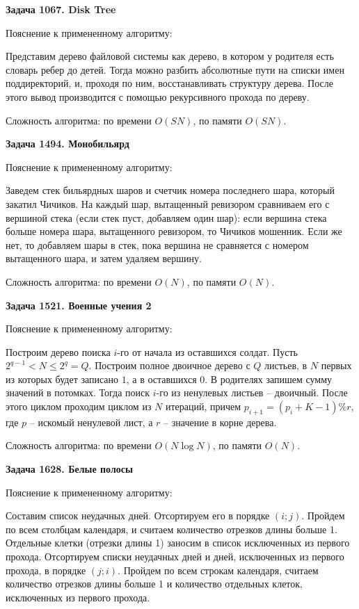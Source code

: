 \documentclass[12pt,a4paper]{article}
\begin{document}
    \newcommand{\LabNumber}{3}
    

    \textbf{Задача 1067. Disk Tree}

    Пояснение к примененному алгоритму:

    Представим дерево файловой системы как дерево, в котором у родителя есть словарь ребер до детей.
    Тогда можно разбить абсолютные пути на списки имен поддиректорий, и, проходя по ним, восстанавливать
    структуру дерева.
    После этого вывод производится с помощью рекурсивного прохода по дереву.

    Сложность алгоритма: по времени $O(SN)$, по памяти $O(SN)$.

    \bigskip

    \textbf{Задача 1494. Монобильярд}

    Пояснение к примененному алгоритму:

    Заведем стек бильярдных шаров и счетчик номера последнего шара, который закатил Чичиков.
    На каждый шар, вытащенный ревизором сравниваем его с вершиной стека (если стек пуст, добавляем один шар):
    если вершина стека больше номера шара, вытащенного ревизором, то Чичиков мошенник.
    Если же нет, то добавляем шары в стек, пока вершина не сравняется с номером вытащенного шара,
    и затем удаляем вершину.

    Сложность алгоритма: по времени $O(N)$, по памяти $O(N)$.

    \bigskip

    \textbf{Задача 1521. Военные учения 2}

    Пояснение к примененному алгоритму:

    Построим дерево поиска $i$-го от начала из оставшихся солдат.
    Пусть $2^{q-1}<N\leq 2^q=Q$.
    Построим полное двоичное дерево с $Q$ листьев, в $N$ первых из которых будет записано $1$, а в оставшихся $0$.
    В родителях запишем сумму значений в потомках.
    Тогда поиск $i$-го из ненулевых листьев -- двоичный.
    После этого циклом проходим циклом из $N$ итераций, причем $p_{i+1}=(p_i+K-1)\%r$,
    где $p$ -- искомый ненулевой лист, а $r$ -- значение в корне дерева.

    Сложность алгоритма: по времени $O(N\log N)$, по памяти $O(N)$.

    \bigskip

    \textbf{Задача 1628. Белые полосы}

    Пояснение к примененному алгоритму:

    Составим список неудачных дней.
    Отсортируем его в порядке $(i;j)$.
    Пройдем по всем столбцам календаря, и считаем количество отрезков длины больше 1.
    Отдельные клетки (отрезки длины 1) заносим в список исключенных из первого прохода.
    Отсортируем списки неудачных дней и дней, исключенных из первого прохода, в порядке $(j;i)$.
    Пройдем по всем строкам календаря, считаем количество отрезков длины больше 1 и
    количество отдельных клеток, исключенных из первого прохода.
\end{document}
